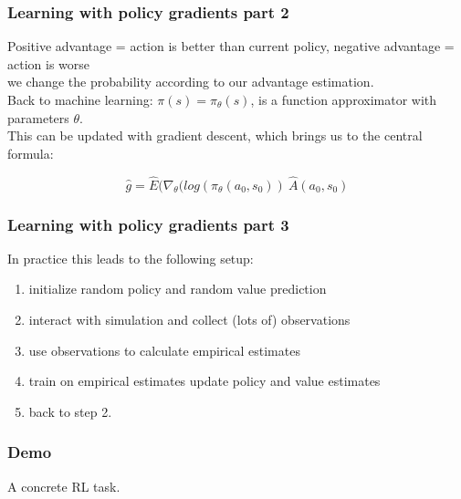 \documentclass{beamer}
\begin{document}
\begin{frame}
\frametitle{Learning with policy gradients part 2}
Positive advantage = action is better than current policy, negative advantage = action is worse\\
\hspace{0.5cm} \textrightarrow  \hspace{0.5cm} we change the probability according to our advantage estimation.\\
\bigskip
Back to machine learning: \(\pi(s) = \pi_\theta(s)\), is a function approximator with parameters \(\theta\). \\
This can be updated with gradient descent, which brings us to the central formula:
\begin{large}
\[\hat{g}= \hat{E}(\nabla_\theta (log(\pi_\theta(a_0, s_0)) \: \hat{A}(a_0, s_0)\]
\end{large}
\end{frame}

\begin{frame}
\frametitle{Learning with policy gradients part 3}
In practice this leads to the following setup:
\begin{enumerate}
\item initialize random policy and random value prediction
\item interact with simulation and collect (lots of) observations
\item use observations to calculate empirical estimates
\item train on empirical estimates \textrightarrow \hspace{0.2cm} update policy and value estimates
\item back to step 2.
\end{enumerate}
\end{frame}

\begin{frame}
\frametitle{Demo}
\begin{center}
A concrete RL task.
\end{center}
\end{frame}
\end{document}
